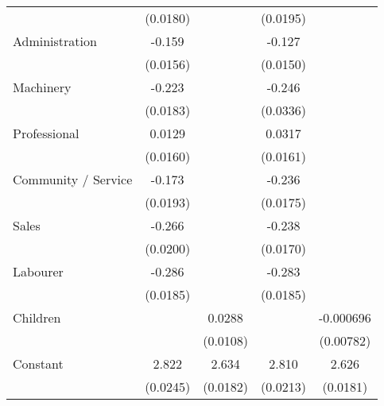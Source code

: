 {\begin{tabular}{l*{4}{c}}
                    &    (0.0180)         &                     &    (0.0195)         &                     \\
[1em]
Administration      &      -0.159\sym{***}&                     &      -0.127\sym{***}&                     \\
                    &    (0.0156)         &                     &    (0.0150)         &                     \\
[1em]
Machinery           &      -0.223\sym{***}&                     &      -0.246\sym{***}&                     \\
                    &    (0.0183)         &                     &    (0.0336)         &                     \\
[1em]
Professional        &      0.0129         &                     &      0.0317\sym{*}  &                     \\
                    &    (0.0160)         &                     &    (0.0161)         &                     \\
[1em]
Community / Service &      -0.173\sym{***}&                     &      -0.236\sym{***}&                     \\
                    &    (0.0193)         &                     &    (0.0175)         &                     \\
[1em]
Sales               &      -0.266\sym{***}&                     &      -0.238\sym{***}&                     \\
                    &    (0.0200)         &                     &    (0.0170)         &                     \\
[1em]
Labourer            &      -0.286\sym{***}&                     &      -0.283\sym{***}&                     \\
                    &    (0.0185)         &                     &    (0.0185)         &                     \\
[1em]
Children            &                     &      0.0288\sym{**} &                     &   -0.000696         \\
                    &                     &    (0.0108)         &                     &   (0.00782)         \\
[1em]
Constant            &       2.822\sym{***}&       2.634\sym{***}&       2.810\sym{***}&       2.626\sym{***}\\
                    &    (0.0245)         &    (0.0182)         &    (0.0213)         &    (0.0181)         \\

\end{tabular}}

